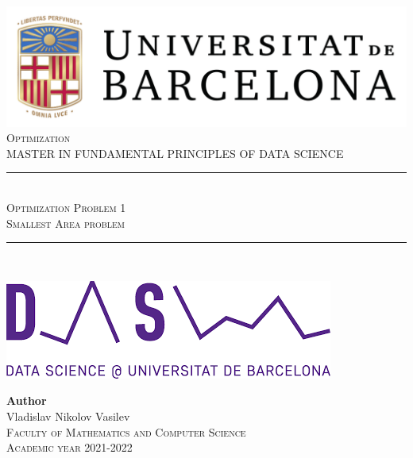 \documentclass[11pt,a4paper]{article}
\newcommand{\subject}{Optimization}
\newcommand{\autor}{Vladislav Nikolov Vasilev}
\newcommand{\titulo}{Optimization Problem 1}
\newcommand{\subtitulo}{Smallest Area problem}
\newcommand{\masters}{Master in Fundamental Principles of Data Science}
\begin{document}

\begin{titlepage}
  \begin{minipage}{\textwidth}
    \centering
    \includegraphics[scale=0.25]{img/ub-logo}\\[2cm]
    
    \textsc{\Large \subject\\[0.5cm]}
    \textsc{\uppercase\expandafter{\masters}}\\[1.5cm]
    
    \noindent\rule[-1ex]{\textwidth}{1pt}\\[1.5ex]
    \textsc{{\Huge \titulo\\[0.5ex]}}
    \textsc{{\Large \subtitulo\\}}
    \noindent\rule[-1ex]{\textwidth}{2pt}\\[3.5ex]
  \end{minipage}
  
  \vspace{2cm}
  
  \begin{minipage}{\textwidth}
    \centering
    
    \includegraphics[scale=0.4]{img/ub-ds-logo}
    \vspace{2cm}
    
    \textbf{Author}\\ {\autor{}}\\[2.5ex]
    \textsc{Faculty of Mathematics and Computer Science}\\
    \vspace{1em}
    \textsc{Academic year 2021-2022}
  \end{minipage}
\end{titlepage}
\end{document}

